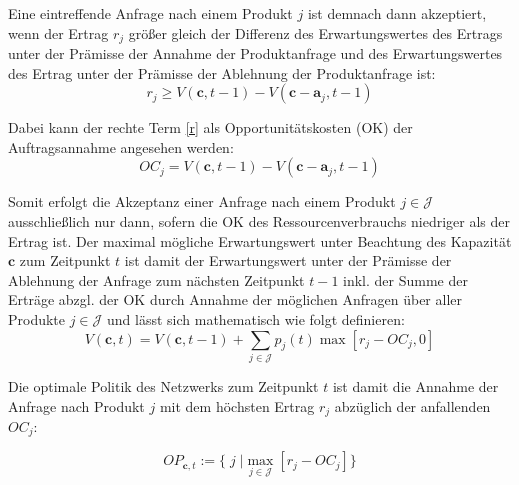 Eine eintreffende Anfrage nach einem Produkt $j$ ist demnach dann akzeptiert, wenn der Ertrag $r_{j}$ größer gleich der Differenz des Erwartungswertes des Ertrags unter der Prämisse der Annahme der Produktanfrage und des Erwartungswertes des Ertrag unter der Prämisse der Ablehnung der Produktanfrage ist:
\begin{equation}\label{r}
r_{j} \ge V(\textbf{c},t-1)-V(\textbf{c}-\textbf{a}_{j},t-1)
\end{equation}

Dabei kann der rechte Term \eqref{r} als Opportunitätskosten (OK) der Auftragsannahme angesehen werden:
\begin{equation}\label{OC}
OC_{j} = V(\textbf{c},t-1)-V(\textbf{c}-\textbf{a}_{j},t-1)
\end{equation}

Somit erfolgt die Akzeptanz einer Anfrage nach einem Produkt $j\in\mathcal{J}$ ausschließlich nur dann, sofern die OK des Ressourcenverbrauchs niedriger als der Ertrag ist. Der maximal mögliche Erwartungswert unter Beachtung des Kapazität $\textbf{c}$ zum Zeitpunkt $t$ ist damit der Erwartungswert unter der Prämisse der Ablehnung der Anfrage zum nächsten Zeitpunkt $t-1$ inkl. der Summe der Erträge abzgl. der OK durch Annahme der möglichen Anfragen über aller Produkte $j\in\mathcal{J}$ und lässt sich mathematisch wie folgt definieren:
\begin{equation}\label{DPoc}
V(\textbf{c},t)=V(\textbf{c},t-1) + \sum_{j\in\mathcal{J}}p_{j}(t) \max[r_{j}-OC_{j},0]
\end{equation}

Die optimale Politik des Netzwerks zum Zeitpunkt $t$ ist damit die Annahme der Anfrage nach Produkt $j$ mit dem höchsten Ertrag $r_{j}$ abzüglich der anfallenden $OC_{j}$:

\begin{equation}\label{OP}
OP_{\textbf{c}, t}:= \{ \; j\; | \max_{j\in\mathcal{J}} [r_{j}-OC_{j}] \} 
\end{equation}

